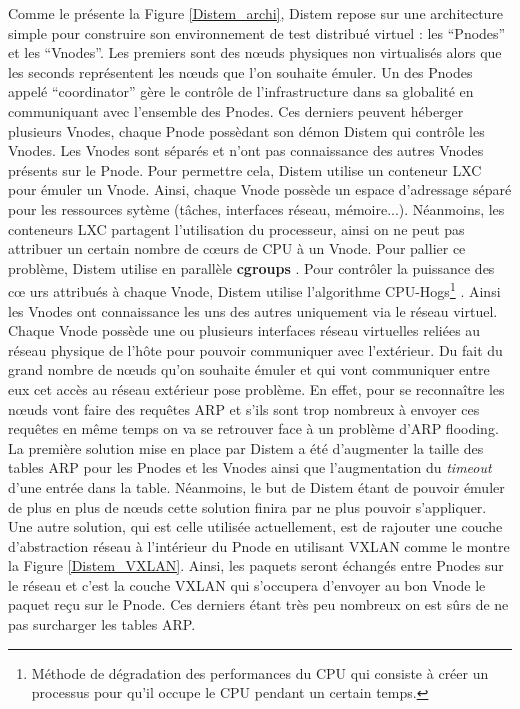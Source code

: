 Comme le présente la Figure \ref{Distem_archi}, Distem repose sur une
architecture simple pour construire son environnement de test distribué virtuel
: les ``Pnodes'' et les ``Vnodes''. Les premiers sont des n\oe uds physiques non
virtualisés alors que les seconds représentent les n\oe uds que l'on souhaite
émuler. Un des Pnodes appelé ``coordinator'' gère le contrôle de
l'infrastructure dans sa globalité en communiquant avec l'ensemble des
Pnodes. Ces derniers peuvent héberger plusieurs Vnodes, chaque Pnode possèdant
son démon Distem qui contrôle les Vnodes. Les Vnodes sont séparés et n'ont pas
connaissance des autres Vnodes présents sur le Pnode. Pour permettre cela,
Distem utilise un conteneur LXC pour émuler un Vnode. Ainsi, chaque Vnode
possède un espace d'adressage séparé pour les ressources sytème (tâches,
interfaces réseau, mémoire...). Néanmoins, les conteneurs LXC partagent
l'utilisation du processeur, ainsi on ne peut pas attribuer un certain nombre de
c\oe urs de CPU à un Vnode. Pour pallier ce problème, Distem utilise en
parallèle \textbf{cgroups} \citep{cgroups}. Pour contrôler la puissance des c\oe
urs attribués à chaque Vnode, Distem utilise l'algorithme
CPU-Hogs\footnote{Méthode de dégradation des performances du CPU qui consiste à
  créer un processus pour qu'il occupe le CPU pendant un certain temps.}
\citep{DISTEM_buchert2011methods}. Ainsi les Vnodes ont connaissance les uns des
autres uniquement via le réseau virtuel. Chaque Vnode possède une ou plusieurs
interfaces réseau virtuelles reliées au réseau physique de l'hôte pour pouvoir
communiquer avec l'extérieur. Du fait du grand nombre de n\oe uds qu'on souhaite
émuler et qui vont communiquer entre eux cet accès au réseau extérieur pose
problème. En effet, pour se reconnaître les n\oe uds vont faire des requêtes ARP
et s'ils sont trop nombreux à envoyer ces requêtes en même temps on va se
retrouver face à un problème d'ARP flooding. La première solution mise en place
par Distem a été d'augmenter la taille des tables ARP pour les Pnodes et les
Vnodes ainsi que l'augmentation du \textit{timeout} d'une entrée dans la
table. Néanmoins, le but de Distem étant de pouvoir émuler de plus en plus de
n\oe uds cette solution finira par ne plus pouvoir s'appliquer. Une autre
solution, qui est celle utilisée actuellement, est de rajouter une couche
d'abstraction réseau à l'intérieur du Pnode en utilisant
VXLAN\citep{VXLAN_mahalingam2014virtual, DISTEM_buchert2014emulation} comme le
montre la Figure \ref{Distem_VXLAN}. Ainsi, les paquets seront échangés entre
Pnodes sur le réseau et c'est la couche VXLAN qui s'occupera d'envoyer au bon
Vnode le paquet reçu sur le Pnode. Ces derniers étant très peu nombreux on est
sûrs de ne pas surcharger les tables ARP.

